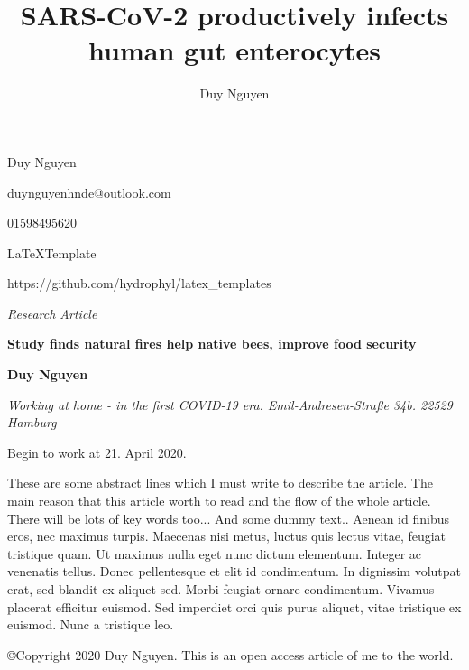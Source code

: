 \documentclass[draft=false
              ,paper=a4
              ,twoside=false
              ,fontsize=10pt
              ,headsepline
              ,BCOR10mm
              ,DIV11
              ]{article}
\title{SARS-CoV-2 productively infects human gut enterocytes}
\author{Duy Nguyen}
\begin{document}
\color{smokyblack}

\setlength{\parskip}{1ex}

\small{Duy Nguyen}

\small{duynguyenhnde@outlook.com}

\small{01598495620}

\small{\LaTeX Template}

\small{https://github.com/hydrophyl/latex\_templates}

\vspace{2cm}

\textsf{\textit{\Large{Research Article}}}

\color{arsenic}
\textsf{\textbf{\huge{Study finds natural fires help native bees, improve food security}}}

\setlength{\parskip}{0.8em}
\color{smokyblack}
\begin{adjustwidth}{3em}{0pt}
\begin{flushleft}
	\textbf{Duy Nguyen}


	\textit{Working at home - in the first COVID-19 era. Emil-Andresen-Stra\ss e 34b. 22529 Hamburg}


	Begin to work at 21. April 2020.


	These are some abstract lines which I must write to describe the article. The main reason that this article worth to read and the flow of the whole article. There will be lots of key words too... And some dummy text.. Aenean id finibus eros, nec maximus turpis. Maecenas nisi metus, luctus quis lectus vitae, feugiat tristique quam. Ut maximus nulla eget nunc dictum elementum. Integer ac venenatis tellus. Donec pellentesque et elit id condimentum. In dignissim volutpat erat, sed blandit ex aliquet sed. Morbi feugiat ornare condimentum. Vivamus placerat efficitur euismod. Sed imperdiet orci quis purus aliquet, vitae tristique ex euismod. Nunc a tristique leo.


	\copyright Copyright 2020 Duy Nguyen. This is an open access article of me to the world.
\end{flushleft}
\end{adjustwidth}

{}
{}
{}

\end{document}
